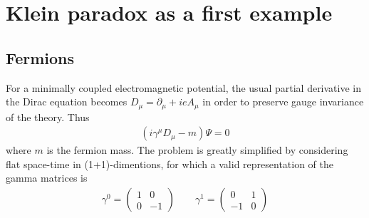 \section{Klein paradox as a first example} 

\subsection{Fermions}

For a minimally coupled electromagnetic potential, the usual partial derivative in the Dirac equation becomes $D_\mu = \partial_\mu + i e A_\mu$ in order to preserve gauge invariance of the theory. Thus
\begin{align}
    ( i \gamma^\mu D_\mu - m ) \Psi = 0
    \label{eq:dirac}
\end{align}
where $m$ is the fermion mass.
The problem is greatly simplified by considering flat space-time in (1+1)-dimentions, for which a valid representation of the gamma matrices is
\begin{align}
    \gamma^0 = \left(\begin{array}{cr} 1 & 0 \\  0 & -1 \end{array}\right) \qquad 
    \gamma^1 = \left(\begin{array}{cr} 0 & 1 \\ -1 & 0 \end{array}\right)
    \label{eq:gamma1+1}
\end{align}

